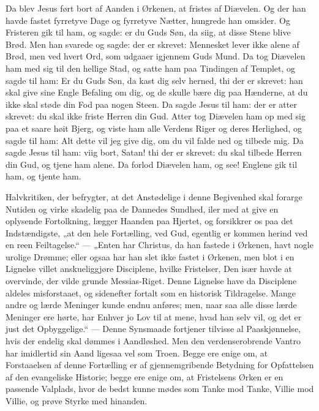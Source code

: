 \documentclass[12pt,a4paper]{book}
\begin{document}
\begingroup\large
Da blev Jesus ført bort af Aanden i Ørkenen, at fristes af Diævelen. Og der han havde
fastet fyrretyve Dage og fyrretyve Nætter, hungrede han omsider. Og Fristeren gik til ham,
og sagde: er du Guds Søn, da siig, at disse Stene blive Brød. Men han svarede og sagde:
der er skrevet: Mennesket lever ikke alene af Brød, men ved hvert Ord, som udgaaer
igjennem Guds Mund. Da tog Diævelen ham med sig til den hellige Stad, og satte ham paa
Tindingen af Templet, og sagde til ham: Er du Guds Søn, da kast dig selv herned, thi der
er skrevet: han skal give sine Engle Befaling om dig, og de skulle bære dig paa Hænderne,
at du ikke skal støde din Fod paa nogen Steen. Da sagde Jesus til ham: der er atter
skrevet: du skal ikke friste Herren din Gud. Atter tog Diævelen ham op med sig paa et
saare høit Bjerg, og viste ham alle Verdens Riger og deres Herlighed, og sagde til ham:
Alt dette vil jeg give dig, om du vil
falde ned og tilbede mig. Da sagde Jesus til ham: viig bort, Satan! thi der er skrevet: du
skal tilbede Herren din Gud, og tjene ham alene. Da forlod Diævelen ham, og see! Englene
gik til ham, og tjente ham.
\par\endgroup

Halvkritiken, der befrygter, at det Anstødelige i denne Begivenhed skal forarge Nutiden og
virke skadelig paa de Dannedes Sundhed, iler med at give en oplysende Fortolkning, lægger
Haanden paa Hjertet, og forsikkrer os paa det Indstændigste, „at den hele Fortælling, ved
Gud, egentlig er kommen herind ved en reen Feiltagelse.“ --- „Enten har Christus, da han
fastede i Ørkenen, havt nogle urolige Drømme; eller ogsaa har han slet ikke fastet i
Ørkenen, men blot i en Lignelse villet anskueliggjøre Disciplene, hvilke Fristelser, Den
især havde at overvinde, der vilde grunde Messias-Riget. Denne Lignelse have da
Disciplene aldeles misforstaaet, og sidenefter fortalt som en historisk Tildragelse. Mange
andre og lærde Meninger kunde endnu anføres; men, naar saa alle disse lærde Meninger ere
hørte, har Enhver jo Lov til at mene, hvad han selv vil, og det er just det
Opbyggelige.“ --- Denne Synsmaade fortjener tilvisse al Paaskjønnelse, hvis der endelig
skal dømmes i Aandløshed. Men den verdenserobrende Vantro har imidlertid sin Aand ligesaa
vel som Troen. Begge ere enige om, at Forstaaelsen af denne Fortælling er af
gjennemgribende Betydning for Opfattelsen af den evangeliske Historie; begge ere enige om,
at Fristelsens Ørken er en passende Valplads, hvor de bedst kunne mødes som Tanke mod
Tanke, Villie mod Villie, og prøve Styrke med hinanden.
\end{document}
